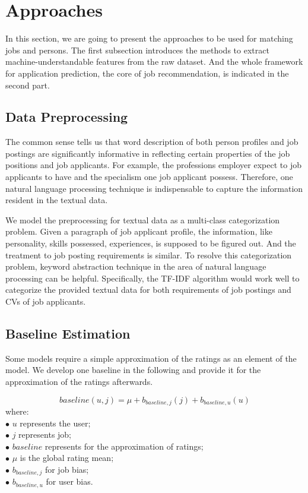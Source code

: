 \documentclass[10pt,twocolumn,letterpaper]{article}
\begin{document}
\section{Approaches}
In this section, we are going to present the approaches to be used for
matching jobs and persons. The first subsection introduces the methods to
extract machine-understandable features from the raw dataset. And the
whole framework for application prediction, the core of job recommendation, is
indicated in the second part.

\subsection{Data Preprocessing}
The common sense tells us that word description of both person profiles and
job postings are significantly informative in reflecting certain properties of
the job positions and job applicants. For example, the professions employer
expect to job applicants to have and the specialism one job applicant
possess. Therefore, one natural language processing technique is indispensable
to capture the information resident in the textual data. 

We model the preprocessing for textual data as a multi-class categorization
problem. Given a paragraph of job applicant profile, the information, like 
personality, skills possessed, experiences, is supposed to be figured out. And
the treatment to job posting requirements is similar. To resolve this
categorization problem, keyword abstraction technique in the area of natural
language processing can be helpful. Specifically, the TF-IDF algorithm would
work well to categorize the provided textual data for both requirements of job
postings and CVs of job applicants.

\subsection{Baseline Estimation} 
Some models require a simple approximation of the ratings as an element of the
model. We develop one baseline in the following and provide it for the
approximation of the ratings afterwards. 

\begin{equation}
    baseline(u, j) = \mu + b_{baseline,j} (j) + b_{baseline, u} (u)
\end{equation}
where: \\
\hspace*{0.5cm} $\bullet$ $u$ represents the user; \\
\hspace*{0.5cm} $\bullet$ $j$ represents job; \\
\hspace*{0.5cm} $\bullet$ $baseline$ represents for the approximation of
ratings; \\
\hspace*{0.5cm} $\bullet$ $\mu$ is the global rating mean; \\
\hspace*{0.5cm} $\bullet$ $b_{baseline,j}$ for job bias; \\
\hspace*{0.5cm} $\bullet$ $b_{baseline,u}$ for user bias.
\end{document}
